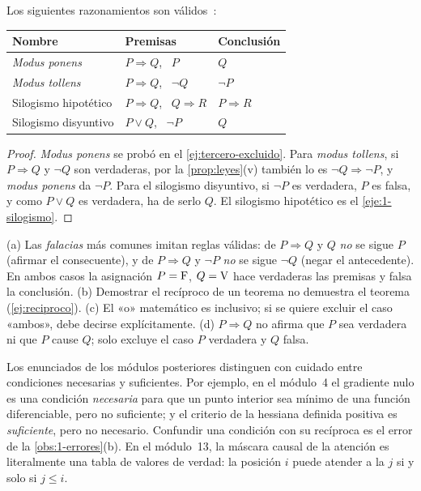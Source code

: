 \begin{proposicion}\label{prop:inferencia}
Los siguientes razonamientos son válidos~\cite[§2.11]{hammack}:
\begin{center}
\begin{tabular}{@{}lll@{}}
\toprule
Nombre & Premisas & Conclusión \\
\midrule
\emph{Modus ponens} & $P\Rightarrow Q$, \ $P$ & $Q$ \\
\emph{Modus tollens} & $P\Rightarrow Q$, \ $\neg Q$ & $\neg P$ \\
Silogismo hipotético & $P\Rightarrow Q$, \ $Q\Rightarrow R$ & $P\Rightarrow R$ \\
Silogismo disyuntivo & $P\vee Q$, \ $\neg P$ & $Q$ \\
\bottomrule
\end{tabular}
\end{center}
\end{proposicion}

\begin{proof}
\emph{Modus ponens} se probó en el \cref{ej:tercero-excluido}. Para \emph{modus tollens}, si $P\Rightarrow Q$ y $\neg Q$ son verdaderas, por la \cref{prop:leyes}(v) también lo es $\neg Q\Rightarrow\neg P$, y \emph{modus ponens} da $\neg P$. Para el silogismo disyuntivo, si $\neg P$ es verdadera, $P$ es falsa, y como $P\vee Q$ es verdadera, ha de serlo $Q$. El silogismo hipotético es el \cref{eje:1-silogismo}.
\end{proof}

\begin{observacion}\label{obs:1-errores}
(a) Las \emph{falacias} más comunes imitan reglas válidas: de $P\Rightarrow Q$ y $Q$ \emph{no} se sigue $P$ (afirmar el consecuente), y de $P\Rightarrow Q$ y $\neg P$ \emph{no} se sigue $\neg Q$ (negar el antecedente). En ambos casos la asignación $P=\mathrm{F}$, $Q=\mathrm{V}$ hace verdaderas las premisas y falsa la conclusión.
(b) Demostrar el recíproco de un teorema no demuestra el teorema (\cref{ej:reciproco}).
(c) El «o» matemático es inclusivo; si se quiere excluir el caso «ambos», debe decirse explícitamente.
(d) $P\Rightarrow Q$ no afirma que $P$ sea verdadera ni que $P$ cause $Q$; solo excluye el caso $P$ verdadera y $Q$ falsa.
\end{observacion}

\begin{observacion}
Los enunciados de los módulos posteriores distinguen con cuidado entre condiciones necesarias y suficientes. Por ejemplo, en el módulo~4 el gradiente nulo es una condición \emph{necesaria} para que un punto interior sea mínimo de una función diferenciable, pero no suficiente; y el criterio de la hessiana definida positiva es \emph{suficiente}, pero no necesario. Confundir una condición con su recíproca es el error de la \cref{obs:1-errores}(b). En el módulo~13, la máscara causal de la atención es literalmente una tabla de valores de verdad: la posición $i$ puede atender a la $j$ si y solo si $j\le i$.
\end{observacion}

